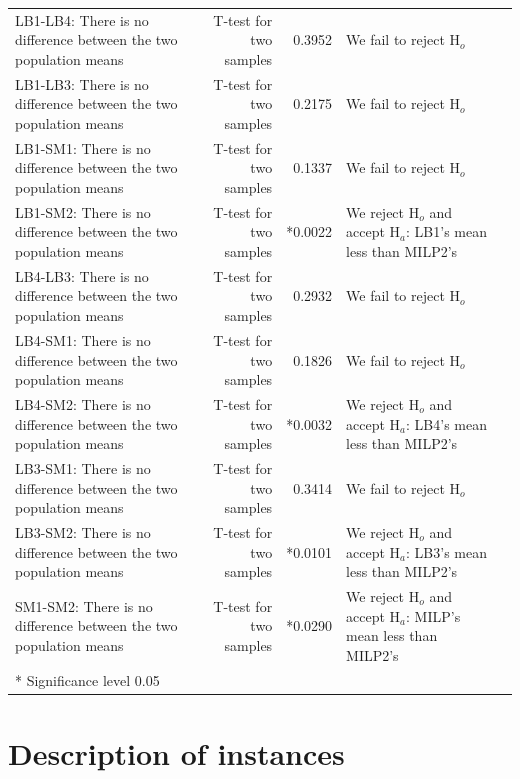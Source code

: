 \begin{table}[H]
{\begin{tabular}{>{\RaggedRight}p{5.5cm}rr>{\RaggedRight}p{5.5cm}r}
LB1-LB4: There is no difference between the two population means & T-test for two samples & 0.3952 & We fail to reject $\text{H}_o$ \\
LB1-LB3: There is no difference between the two population means & T-test for two samples & 0.2175 & We fail to reject $\text{H}_o$ \\
LB1-SM1: There is no difference between the two population means & T-test for two samples & 0.1337 & We fail to reject $\text{H}_o$ \\
LB1-SM2: There is no difference between the two population means & T-test for two samples & *0.0022 & We reject $\text{H}_o$ and accept $\text{H}_a$: LB1's mean less than MILP2's \\
LB4-LB3: There is no difference between the two population means & T-test for two samples & 0.2932 & We fail to reject $\text{H}_o$ \\
LB4-SM1: There is no difference between the two population means & T-test for two samples & 0.1826 & We fail to reject $\text{H}_o$ \\
LB4-SM2: There is no difference between the two population means & T-test for two samples & *0.0032 & We reject $\text{H}_o$ and accept $\text{H}_a$: LB4's mean less than MILP2's \\
LB3-SM1: There is no difference between the two population means & T-test for two samples & 0.3414 & We fail to reject $\text{H}_o$ \\
LB3-SM2: There is no difference between the two population means & T-test for two samples & *0.0101 & We reject $\text{H}_o$ and accept $\text{H}_a$: LB3's mean less than MILP2's \\
SM1-SM2: There is no difference between the two population means & T-test for two samples & *0.0290 & We reject $\text{H}_o$ and accept $\text{H}_a$: MILP's mean less than MILP2's \\
\bottomrule
*  Significance level 0.05
\end{tabular}
}
\end{table}

\newpage
\setcounter{table}{0}
\setcounter{figure}{0}
\renewcommand{\thetable}{D\arabic{table}}
\renewcommand{\thefigure}{D\arabic{figure}}
\section{Description of instances} \label{app:appD}


